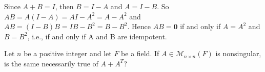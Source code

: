 \smallskip
\begin{solution}

Since $A + B = I$, then $B = I - A$ and $A = I - B$. So $AB = A(I - A) = AI - A^2 = A - A^2$ 
and $AB = (I - B)B = IB - B^2 = B - B^2$. Hence $AB = \mathbf{0}$ if and only if $A = A^2$ and 
$B = B^2$, i.e., if and only if A and B are idempotent.

\end{solution}

\probskip

\begin{ex}[Golan 530]
Let $n$ be a positive integer and let $F$ be a field.  If
$A \in \mathcal{M}_{n\times n}(F)$ is nonsingular, is the same necessarily true
of $A + A^T$?
\end{ex}

%
%


